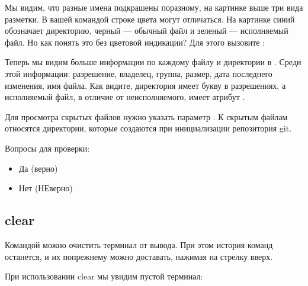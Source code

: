 \documentclass[letterpaper,10pt,russian]{sphinxmanual}
\begin{document}
\sphinxAtStartPar
{}

\sphinxAtStartPar
Мы видим, что разные имена подкрашены по\sphinxhyphen{}разному, на картинке выше три вида разметки. В вашей командой строке цвета могут отличаться. На картинке синий обозначает директорию, черный — обычный файл и зеленый — исполняемый файл. Но как понять это без цветовой индикации? Для этого вызовите :

\sphinxAtStartPar
{}

\sphinxAtStartPar
Теперь мы видим больше информации по каждому файлу и директории в . Среди этой информации: разрешение, владелец, группа, размер, дата последнего изменения, имя файла. Как видите, директория имеет букву  в разрешениях, а исполняемый файл, в отличие от неисполняемого, имеет атрибут .

\sphinxAtStartPar
Для просмотра скрытых файлов нужно указать параметр . К скрытым файлам относятся директории, которые создаются при инициализации репозитория git.

\sphinxAtStartPar
{}

\sphinxAtStartPar
Вопросы для проверки:

\sphinxAtStartPar
{}
\begin{itemize}
\item {} 
\sphinxAtStartPar
Да (верно)

\item {} 
\sphinxAtStartPar
Нет (НЕверно)

\end{itemize}


\subsection{clear}
\label{\detokenize{educational_materials/bash/content:clear}}
\sphinxAtStartPar
Командой  можно очистить терминал от вывода. При этом история команд останется, и их по\sphinxhyphen{}прежнему можно доставать, нажимая на стрелку вверх.

\sphinxAtStartPar
{}

\sphinxAtStartPar
При использовании clear мы увидим пустой терминал:
\end{document}
